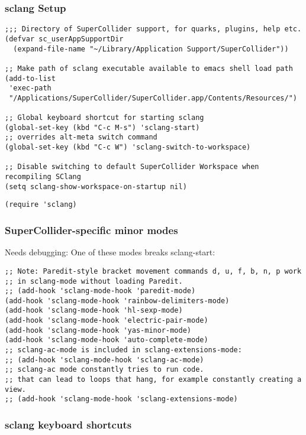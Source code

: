 \documentclass[nofonts]{tufte-handout}
\begin{document}
\subsubsection{sclang Setup}
\label{sec-2-2-1}
\begin{verbatim}
;;; Directory of SuperCollider support, for quarks, plugins, help etc.
(defvar sc_userAppSupportDir
  (expand-file-name "~/Library/Application Support/SuperCollider"))

;; Make path of sclang executable available to emacs shell load path
(add-to-list
 'exec-path
 "/Applications/SuperCollider/SuperCollider.app/Contents/Resources/")

;; Global keyboard shortcut for starting sclang
(global-set-key (kbd "C-c M-s") 'sclang-start)
;; overrides alt-meta switch command
(global-set-key (kbd "C-c W") 'sclang-switch-to-workspace)

;; Disable switching to default SuperCollider Workspace when recompiling SClang
(setq sclang-show-workspace-on-startup nil)
\end{verbatim}

\begin{verbatim}
(require 'sclang)
\end{verbatim}

\subsubsection{SuperCollider-specific minor modes}
\label{sec-2-2-2}

Needs debugging: One of these modes breaks sclang-start:

\begin{verbatim}
;; Note: Paredit-style bracket movement commands d, u, f, b, n, p work
;; in sclang-mode without loading Paredit.
;; (add-hook 'sclang-mode-hook 'paredit-mode)
(add-hook 'sclang-mode-hook 'rainbow-delimiters-mode)
(add-hook 'sclang-mode-hook 'hl-sexp-mode)
(add-hook 'sclang-mode-hook 'electric-pair-mode)
(add-hook 'sclang-mode-hook 'yas-minor-mode)
(add-hook 'sclang-mode-hook 'auto-complete-mode)
;; sclang-ac-mode is included in sclang-extensions-mode:
;; (add-hook 'sclang-mode-hook 'sclang-ac-mode)
;; sclang-ac mode constantly tries to run code.
;; that can lead to loops that hang, for example constantly creating a view.
;; (add-hook 'sclang-mode-hook 'sclang-extensions-mode)
\end{verbatim}

\subsubsection{sclang keyboard shortcuts}
\label{sec-2-2-3}
\end{document}

